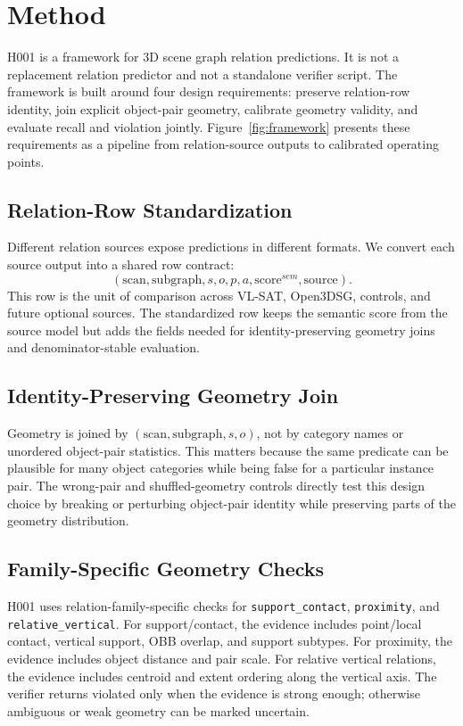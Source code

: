 \section{Method}

H001 is a \method{} framework for 3D scene graph relation predictions. It is
not a replacement relation predictor and not a standalone verifier script. The
framework is built around four design requirements: preserve relation-row
identity, join explicit object-pair geometry, calibrate geometry validity, and
evaluate recall and violation jointly. Figure~\ref{fig:framework} presents
these requirements as a pipeline from relation-source outputs to calibrated
operating points.

\subsection{Relation-Row Standardization}

Different relation sources expose predictions in different formats. We convert
each source output into a shared row contract:
\begin{equation}
(\mathrm{scan},\mathrm{subgraph},s,o,p,a,\mathrm{score}^{sem},\mathrm{source}).
\end{equation}
This row is the unit of comparison across VL-SAT, Open3DSG, controls, and
future optional sources. The standardized row keeps the semantic score from the
source model but adds the fields needed for identity-preserving geometry joins
and denominator-stable evaluation.

\subsection{Identity-Preserving Geometry Join}

Geometry is joined by $(\mathrm{scan},\mathrm{subgraph},s,o)$, not by category
names or unordered object-pair statistics. This matters because the same
predicate can be plausible for many object categories while being false for a
particular instance pair. The wrong-pair and shuffled-geometry controls
directly test this design choice by breaking or perturbing object-pair identity
while preserving parts of the geometry distribution.

\subsection{Family-Specific Geometry Checks}

H001 uses relation-family-specific checks for \texttt{support\_contact},
\texttt{proximity}, and \texttt{relative\_vertical}. For support/contact, the
evidence includes point/local contact, vertical support, OBB overlap, and
support subtypes. For proximity, the evidence includes object distance and pair
scale. For relative vertical relations, the evidence includes centroid and
extent ordering along the vertical axis. The verifier returns violated only
when the evidence is strong enough; otherwise ambiguous or weak geometry can be
marked uncertain.

